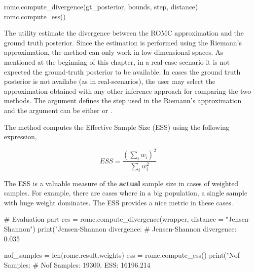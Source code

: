 \begin{Code}
romc.compute_divergence(gt_posterior, bounds, step, distance)
romc.compute_ess()
\end{Code}

\noindent
The utility  estimate the divergence between
the ROMC approximation and the ground truth posterior. Since the
estimation is performed using the Riemann's approximation, the method
can only work in low dimensional spaces. As mentioned at the beginning
of this chapter, in a real-case scenario it is not expected the
ground-truth posterior to be available. In cases the ground truth
posterior is not availabe (as in real-scenarios), the user may select
the approximation obtained with any other inference approach for
comparing the two methods. The argument  defines the step
used in the Riemann's approximation and the argument 
can be either  or .

The method  computes the Effective Sample Size
(ESS) using the following expression,

\begin{equation} \label{eq:ESS}
  ESS = \frac{(\sum_i w_i)^2}{\sum_i w_i^2}
\end{equation}

The ESS is a valuable measure of the \textbf{actual} sample size in
cases of weighted samples. For example, there are cases where in a big
population, a single sample with huge weight dominates. The ESS
provides a nice metric in these cases.

\begin{Code}
# Evaluation part
res = romc.compute_divergence(wrapper, distance = "Jensen-Shannon")
print("Jensen-Shannon divergence: %
# Jensen-Shannon divergence: 0.035

nof_samples = len(romc.result.weights)
ess = romc.compute_ess()
print("Nof Samples: %
# Nof Samples: 19300, ESS: 16196.214
\end{Code}
